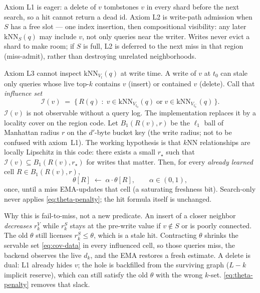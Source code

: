 Axiom L1 is eager: a delete of \(v\) tombstones \(v\) in every shard
before the next search, so a hit cannot return a dead id. Axiom L2 is
write-path admission when \(S\) has a free slot --- one index insertion,
then compositional visibility: any later \(\mathrm{kNN}_{S}(q)\) may
include \(v\), not only queries near the writer. Writes never evict a
shard to make room; if \(S\) is full, L2 is deferred to the next miss in
that region (miss-admit), rather than destroying unrelated
neighborhoods.

Axiom L3 cannot inspect \(\mathrm{kNN}_{V_t}(q)\) at write time. A
write of \(v\) at \(t_0\) can stale only queries whose live top-$k$
contains \(v\) (insert) or contained \(v\) (delete). Call that
\emph{influence set}
\begin{equation}
  \mathcal{I}(v)
  \;=\;
  \bigl\{\, R(q) \;:\;
    v\in\mathrm{kNN}_{V_{t_0}}(q)
    \;\text{or}\;
    v\in\mathrm{kNN}_{V_{t_0^-}}(q)
  \,\bigr\}.
  \label{eq:influence}
\end{equation}
\(\mathcal{I}(v)\) is not observable without a query log. The
implementation replaces it by a locality cover on the region code. Let
\(B_1(R(v),r)\) be the \(\ell_1\) ball of Manhattan radius \(r\) on the
\(d'\)-byte bucket key (the write radius; not to be confused with
axiom~L1). The working hypothesis is that \(k\)NN relationships are
locally Lipschitz in this code: there exists a small \(r_\star\) such
that \(\mathcal{I}(v)\subseteq B_1(R(v),r_\star)\) for writes that
matter. Then, for every \emph{already learned} cell
\(R\in B_1(R(v),r)\),
\begin{equation}
  \theta[R] \;\leftarrow\; \alpha\cdot\theta[R],
  \qquad \alpha\in(0,1),
  \label{eq:theta-penalty}
\end{equation}
once, until a miss EMA-updates that cell (a saturating freshness bit).
Search-only never applies \eqref{eq:theta-penalty}; the hit formula
itself is unchanged.

Why this is fail-to-miss, not a new predicate. An insert of a closer
neighbor \emph{decreases} \(r^{V}_k\) while \(r^{S}_k\) stays at the
pre-write value if \(v\notin S\) or is poorly connected. The old
\(\theta\) still licenses \(r^{S}_k\le\theta\), which is a stale hit.
Contracting \(\theta\) shrinks the servable set
\eqref{eq:cov-data} in every influenced cell, so those queries miss,
the backend observes the live \(d_k\), and the EMA restores a fresh
estimate. A delete is dual: L1 already hides \(v\); the hole is
backfilled from the surviving graph (\(L-k\) implicit reserve), which
can still satisfy the old \(\theta\) with the wrong \(k\)-set.
\eqref{eq:theta-penalty} removes that slack.

